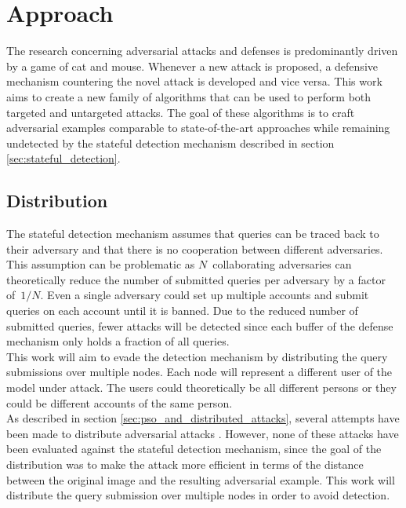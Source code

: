 \chapter{Approach}\label{chap:approach}
The research concerning adversarial attacks and defenses is predominantly driven by a game of cat and mouse. Whenever a new attack is proposed, a defensive mechanism countering the novel attack is developed and vice versa. This work aims to create a new family of algorithms that can be used to perform both targeted and untargeted attacks. The goal of these algorithms is to craft adversarial examples comparable to state-of-the-art approaches while remaining undetected by the stateful detection mechanism \cite{chen_stateful_2019} described in section \ref{sec:stateful_detection}.

\section{Distribution}
The stateful detection mechanism \cite{chen_stateful_2019} assumes that queries can be traced back to their adversary and that there is no cooperation between different adversaries. This assumption can be problematic as $N$~collaborating adversaries can theoretically reduce the number of submitted queries per adversary by a factor of~$1/N$. Even a single adversary could set up multiple accounts and submit queries on each account until it is banned. Due to the reduced number of submitted queries, fewer attacks will be detected since each buffer of the defense mechanism only holds a fraction of all queries.\\

This work will aim to evade the detection mechanism by distributing the query submissions over multiple nodes. Each node will represent a different user of the model under attack. The users could theoretically be all different persons or they could be different accounts of the same person.\\

As described in section \ref{sec:pso_and_distributed_attacks}, several attempts have been made to distribute adversarial attacks \cite{distributed_pso_attack, suryanto2020}. However, none of these attacks have been evaluated against the stateful detection mechanism, since the goal of the distribution was to make the attack more efficient in terms of the distance between the original image and the resulting adversarial example. This work will distribute the query submission over multiple nodes in order to avoid detection.\\

